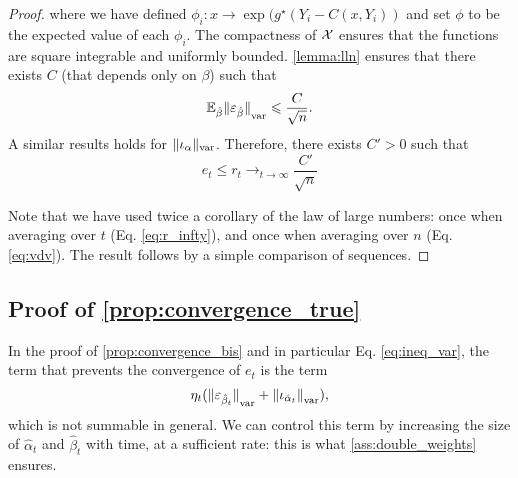 \begin{proof}
where we have defined $\phi_i: x \to \exp(g^\star(Y_i - C(x, Y_i))$ and set
$\phi$ to be the expected value of each $\phi_i$. The compactness of $\mathcal{X}$
ensures that the functions  are square integrable and uniformly bounded.
\autoref{lemma:lln} ensures that there exists $C$ (that depends only on $\beta$)
such that
\begin{equation}\label{eq:vdv}
    \mathbb{E}_{\hat \beta} {\Vert \varepsilon_{\hat \beta} \Vert}_{\text{\upshape var}}  \leqslant \frac{C}{\sqrt{n}}.
\end{equation}
A similar results holds for $\Vert \iota_\alpha \Vert_{\text{\upshape var}}$. Therefore, there exists $C' > 0$ such that
\begin{equation}
    e_t \leq r_t \to_{t\to \infty} \frac{C'}{\sqrt{n}}
\end{equation}

Note that we have used twice a corollary of the law of large numbers: once when averaging over $t$ (Eq. \eqref{eq:r_infty}), and once when averaging over $n$ (Eq. \eqref{eq:vdv}).
The result follows by a simple comparison of sequences.
\end{proof}

\subsection{Proof of \autoref{prop:convergence_true}}\label{sec:proof_prop_convergence}

In the proof of \autoref{prop:convergence_bis} and in particular Eq. \eqref{eq:ineq_var}, the term that prevents the convergence of $e_t$ is the term
\begin{equation}
    \eta_t ({\Vert \varepsilon_{\hat \beta_t} \Vert}_{\text{\upshape var}} + 
    {\Vert \iota_{\hat \alpha_t} \Vert}_{\text{\upshape var}}),
\end{equation}
which is not summable in general. We can control this term by increasing the
 size of $\hat \alpha_t$ and $\hat \beta_t$ with time, at a sufficient rate: this is what \autoref{ass:double_weights} ensures.

